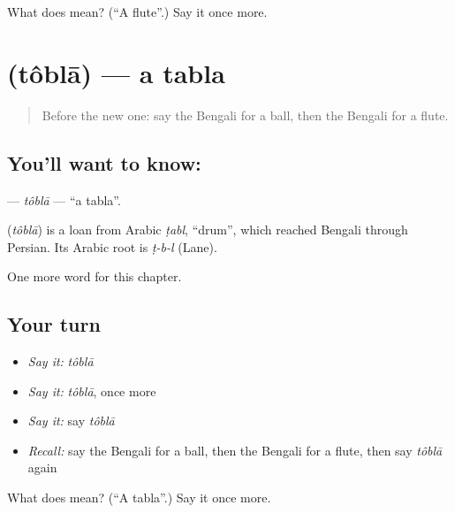 \begin{tcolorbox}[breakable,colback=teal!4,colframe=teal!35!black,title={Before you move on}]
What does  mean? (\textquotedblleft{}A flute\textquotedblright{}.) Say it once more.
\end{tcolorbox}
\section[\texorpdfstring{\bn{তবলা} (tôblā)}{তবলা (tôblā)}]{ (tôblā) — a tabla}

\label{lesson:BN-C131-tobla}



\begin{quote}
Before the new one: say the Bengali for a ball, then the Bengali for a flute.
\end{quote}

\subsection*{You'll want to know: }
\textbf{} — \emph{tôblā} — \textquotedblleft{}a tabla\textquotedblright{}.

\begin{cousinweb}
\textbf{} (\emph{tôblā}) is a loan from Arabic \emph{ṭabl}, \textquotedblleft{}drum\textquotedblright{}, which reached Bengali through Persian. Its Arabic root is \emph{ṭ-b-l} (Lane).
\end{cousinweb}

\begin{grammarlens}[title={What you've built}]
One more word for this chapter.
\end{grammarlens}

\subsection*{Your turn}
\begin{itemize}
\raggedright
  \item \emph{Say it:} \emph{tôblā}
  \item \emph{Say it:} \emph{tôblā}, once more
  \item \emph{Say it:} say \emph{tôblā}
  \item \emph{Recall:} say the Bengali for a ball, then the Bengali for a flute, then say \emph{tôblā} again
\end{itemize}

\begin{tcolorbox}[breakable,colback=teal!4,colframe=teal!35!black,title={Before you move on}]
What does  mean? (\textquotedblleft{}A tabla\textquotedblright{}.) Say it once more.
\end{tcolorbox}

